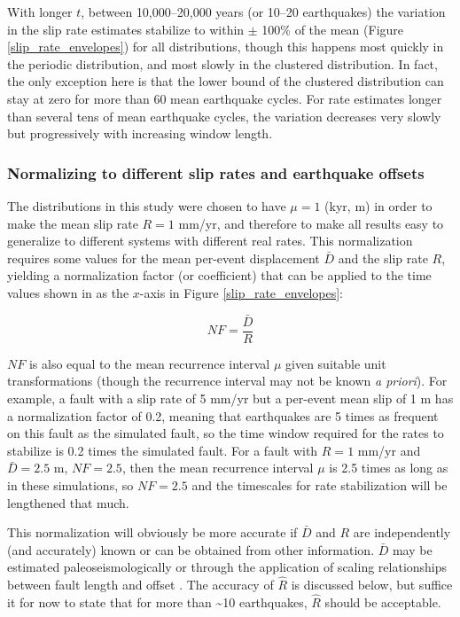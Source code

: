 \documentclass[se, manuscript]{copernicus}
\begin{document}
With longer \(t\), between 10,000--20,000 years (or 10--20 earthquakes)
the variation in the slip rate estimates stabilize to within \(\pm\)
100\% of the mean (Figure \ref{slip_rate_envelopes}) for all
distributions, though this happens most quickly in the periodic
distribution, and most slowly in the clustered distribution. In fact,
the only exception here is that the lower bound of the clustered
distribution can stay at zero for more than 60 mean earthquake cycles.
For rate estimates longer than several tens of mean earthquake cycles,
the variation decreases very slowly but progressively with increasing
window length.

\subsubsection{Normalizing to different slip rates and earthquake
offsets}\label{normalizing-to-different-slip-rates-and-earthquake-offsets}

The distributions in this study were chosen to have \(\mu=1\) (kyr, m)
in order to make the mean slip rate \(R=1\) mm/yr, and therefore to make
all results easy to generalize to different systems with different real
rates. This normalization requires some values for the mean per-event
displacement \(\bar{D}\) and the slip rate \(R\), yielding a
normalization factor (or coefficient) that can be applied to the time
values shown in as the \(x\)-axis in Figure \ref{slip_rate_envelopes}:

\begin{equation}
  NF = \frac{\bar{D}}{R}
  \label{norm_eqn}
\end{equation}

\(NF\) is also equal to the mean recurrence interval \(\mu\) given
suitable unit transformations (though the recurrence interval may not be
known \emph{a priori}). For example, a fault with a slip rate of 5 mm/yr
but a per-event mean slip of 1 m has a normalization factor of 0.2,
meaning that earthquakes are 5 times as frequent on this fault as the
simulated fault, so the time window required for the rates to stabilize
is 0.2 times the simulated fault. For a fault with \(R=1\) mm/yr and
\(\bar{D}=2.5\) m, \(NF=2.5\), then the mean recurrence interval \(\mu\)
is 2.5 times as long as in these simulations, so \(NF=2.5\) and the
timescales for rate stabilization will be lengthened that much.

This normalization will obviously be more accurate if \(\bar{D}\) and
\(R\) are independently (and accurately) known or can be obtained from
other information. \(\bar{D}\) may be estimated paleoseismologically or
through the application of scaling relationships between fault length
and offset \citep{wells_new_1994,leonard_earthquake_2010}. The accuracy of \(\hat{R}\) is discussed
below, but suffice it for now to state that for more than
\textasciitilde{}10 earthquakes, \(\hat{R}\) should be acceptable.
\end{document}
